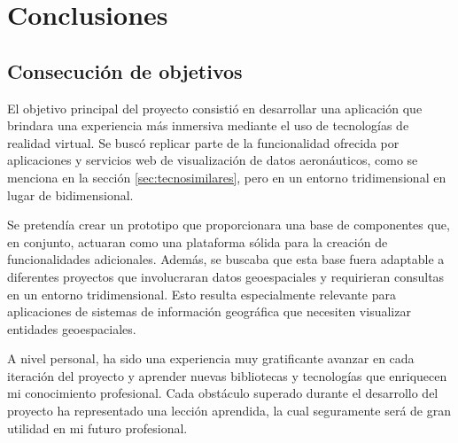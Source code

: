 \documentclass[a4paper, 11pt]{book}
\begin{document}

\clearpage
\chapter{Conclusiones}
\label{chap:conclusiones}
\section{Consecución de objetivos}
\label{sec:consecucion-objetivos}
El objetivo principal del proyecto consistió en desarrollar una aplicación que brindara una experiencia más inmersiva mediante el uso de tecnologías de realidad virtual. Se buscó replicar parte de la funcionalidad ofrecida por aplicaciones y servicios web de visualización de datos aeronáuticos, como se menciona en la sección \ref{sec:tecnosimilares}, pero en un entorno tridimensional en lugar de bidimensional.

Se pretendía crear un prototipo que proporcionara una base de componentes que, en conjunto, actuaran como una plataforma sólida para la creación de funcionalidades adicionales. Además, se buscaba que esta base fuera adaptable a diferentes proyectos que involucraran datos geoespaciales y requirieran consultas en un entorno tridimensional. Esto resulta especialmente relevante para aplicaciones de sistemas de información geográfica que necesiten visualizar entidades geoespaciales.

A nivel personal, ha sido una experiencia muy gratificante avanzar en cada iteración del proyecto y aprender nuevas bibliotecas y tecnologías que enriquecen mi conocimiento profesional. Cada obstáculo superado durante el desarrollo del proyecto ha representado una lección aprendida, la cual seguramente será de gran utilidad en mi futuro profesional.
\end{document}
